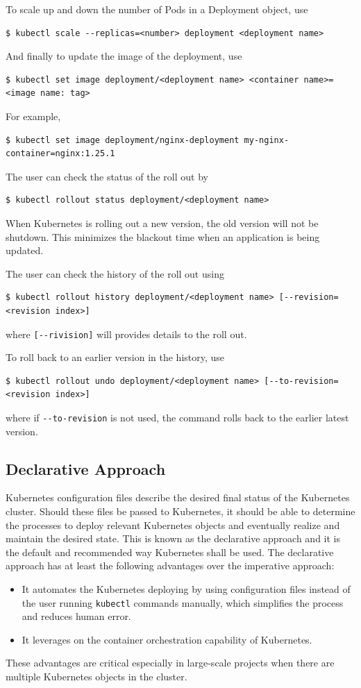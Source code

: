 To scale up and down the number of Pods in a Deployment object, use
\begin{lstlisting}
$ kubectl scale --replicas=<number> deployment <deployment name>
\end{lstlisting}

And finally to update the image of the deployment, use
\begin{lstlisting}
$ kubectl set image deployment/<deployment name> <container name>=<image name: tag>
\end{lstlisting}
For example,
\begin{lstlisting}
$ kubectl set image deployment/nginx-deployment my-nginx-container=nginx:1.25.1
\end{lstlisting}

The user can check the status of the roll out by
\begin{lstlisting}
$ kubectl rollout status deployment/<deployment name>
\end{lstlisting}
When Kubernetes is rolling out a new version, the old version will not be shutdown. This minimizes the blackout time when an application is being updated.

The user can check the history of the roll out using
\begin{lstlisting}
$ kubectl rollout history deployment/<deployment name> [--revision=<revision index>]
\end{lstlisting}
where \verb|[--rivision]| will provides details to the roll out.

To roll back to an earlier version in the history, use
\begin{lstlisting}
$ kubectl rollout undo deployment/<deployment name> [--to-revision=<revision index>]
\end{lstlisting}
where if \verb|--to-revision| is not used, the command rolls back to the earlier latest version.

\subsection{Declarative Approach}

Kubernetes configuration files describe the desired final status of the Kubernetes cluster. Should these files be passed to Kubernetes, it should be able to determine the processes to deploy relevant Kubernetes objects and eventually realize and maintain the desired state. This is known as the declarative approach and it is the default and recommended way Kubernetes shall be used. The declarative approach has at least the following advantages over the imperative approach:
\begin{itemize}
  \item It automates the Kubernetes deploying by using configuration files instead of the user running \verb|kubectl| commands manually, which simplifies the process and reduces human error.
  \item It leverages on the container orchestration capability of Kubernetes.
\end{itemize}
These advantages are critical especially in large-scale projects when there are multiple Kubernetes objects in the cluster.


